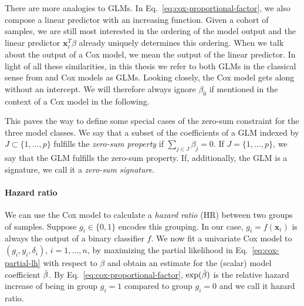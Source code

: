 There are more analogies to GLMs. In Eq.\ \eqref{eq:cox-proportional-factor}, we also compose a 
linear predictor with an increasing function. Given a cohort of samples, we are still most 
interested in the ordering of the model output and the linear predictor $\mathbf{x}_i^T \beta$ 
already uniquely determines this ordering. When we talk about the output of a Cox model, we 
mean the output of the linear predictor. In light of all these similarities,
in this thesis we refer to both GLMs in the classical sense from \cite{glm72} and Cox models as 
GLMs. Looking closely, the Cox model gets along without an intercept. We will therefore always 
ignore $\beta_0$ if mentioned in the context of a Cox model in the following.

This paves the way to define some special cases of the zero-sum constraint for the three model 
classes. We say that a subset of the coefficients of a GLM indexed by $J \subset \{1, \ldots, p \}$ 
fulfills the \textit{zero-sum property} if $\sum_{j \in J} \beta_j = 0$. If $J = \{1, \ldots, p \}$, 
we say that the GLM fulfills the zero-sum property. If, additionally, the GLM is a signature, we 
call it a \textit{zero-sum signature}. 

\paragraph{Hazard ratio}

We can use the Cox model to calculate a \textit{hazard ratio} (HR) between two groups of samples. 
Suppose $g_i \in \{0, 1\}$ encodes this grouping. In our case, $g_i = f(\mathbf{x}_i)$ is always 
the output of a binary classifier $f$. We now fit a univariate Cox model to $(g_i, y_i, \delta_i)$, 
$i = 1, \ldots, n$, by maximizing 
the partial likelihood in Eq.\ \eqref{eq:cox-partial-lh} with respect to $\beta$ and obtain an estimate
for the (scalar) model coefficient $\hat{\beta}$. By Eq.\ \eqref{eq:cox-proportional-factor}, 
$\exp(\hat{\beta})$ is the relative hazard increase of being in group $g_i = 1$ compared to group 
$g_i = 0$ and we call it hazard ratio.

